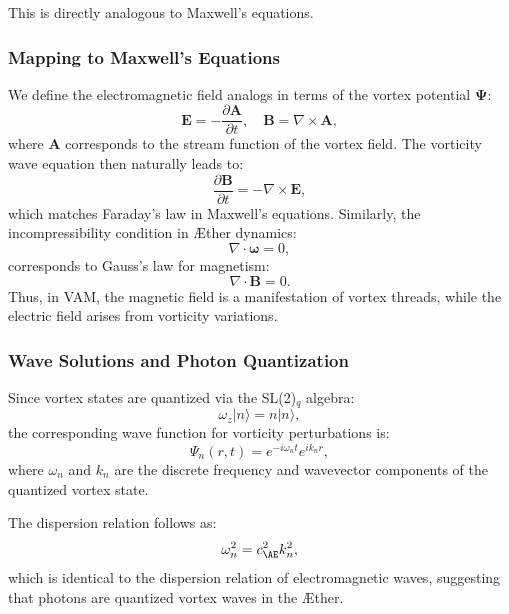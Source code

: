 \documentclass[a4paper,10pt]{article}
\begin{document}
This is directly analogous to Maxwell's equations.

\subsubsection*{Mapping to Maxwell's Equations}

We define the electromagnetic field analogs in terms of the vortex potential $\boldsymbol{\Psi}$:
\begin{equation*}
    \mathbf{E} = -\frac{\partial \mathbf{A}}{\partial t}, \quad \mathbf{B} = \nabla \times \mathbf{A},
\end{equation*}
where $\mathbf{A}$ corresponds to the stream function of the vortex field. The vorticity wave equation then naturally leads to:
\begin{equation*}
    \frac{\partial \mathbf{B}}{\partial t} = -\nabla \times \mathbf{E},
\end{equation*}
which matches Faraday's law in Maxwell's equations. Similarly, the incompressibility condition in Æther dynamics:
\begin{equation*}
    \nabla \cdot \boldsymbol{\omega} = 0,
\end{equation*}
corresponds to Gauss's law for magnetism:
\begin{equation*}
    \nabla \cdot \mathbf{B} = 0.
\end{equation*}
Thus, in VAM, the magnetic field is a manifestation of vortex threads, while the electric field arises from vorticity variations.

\subsubsection*{Wave Solutions and Photon Quantization}

Since vortex states are quantized via the SL(2)$_q$ algebra:
\begin{equation*}
    \omega_z |n\rangle = n |n\rangle,
\end{equation*}
the corresponding wave function for vorticity perturbations is:
\begin{equation*}
    \Psi_n (r, t) = e^{-i \omega_n t} e^{i k_n r},
\end{equation*}
where $\omega_n$ and $k_n$ are the discrete frequency and wavevector components of the quantized vortex state.

The dispersion relation follows as:
\begin{equation*}
    \omega_n^2 = c_{\AE}^2 k_n^2,
\end{equation*}
which is identical to the dispersion relation of electromagnetic waves, suggesting that photons are quantized vortex waves in the Æther.
\end{document}
